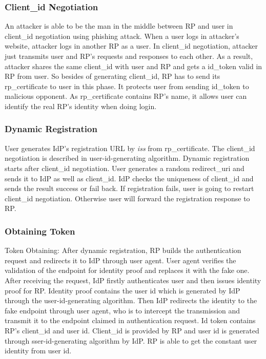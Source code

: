 

\subsubsection{Client\_id Negotiation}
An attacker is able to be the man in the middle between RP and user in client\_id negotiation using phishing attack. When a user logs in attacker's website, attacker logs in another RP as a user. In client\_id negotiation, attacker just transmits user and RP's requests and responses to each other. As a result, attacker shares the same client\_id with user and RP and gets a id\_token valid in RP from user.
So besides of generating client\_id, RP has to send its rp\_certificate to user in this phase. It protects user from sending id\_token to malicious opponent. As rp\_certificate contains RP's name, it allows user can identify the real RP's identity when doing login.
\subsubsection{Dynamic Registration}
User generates IdP's registration URL by \emph{iss} from rp\_certificate. 
The client\_id negotiation is described in user-id-generating algorithm. Dynamic registration starts after client\_id negotiation. User generates a random redirect\_uri and sends it to IdP as well as client\_id. IdP checks the uniqueness of client\_id and sends the result success or fail back. If registration fails, user is going to restart client\_id negotiation. Otherwise user will forward the registration response to RP.  
\subsubsection{Obtaining Token}
Token Obtaining: After dynamic registration, RP builds the authentication request and redirects it to IdP through user agent. User agent verifies the validation of the endpoint for identity proof and replaces it with the fake one. After receiving the request, IdP firstly authenticates user and then issues identity proof for RP. Identity proof contains the user id which is generated by IdP through the user-id-generating algorithm. Then IdP redirects the identity to the fake endpoint through user agent, who is to intercept the transmission and transmit it to the endpoint claimed in authentication request. 
Id token contains RP's client\_id and user id. Client\_id is provided by RP and user id is generated through sser-id-generating algorithm by IdP. RP is able to get the constant user identity from user id.



